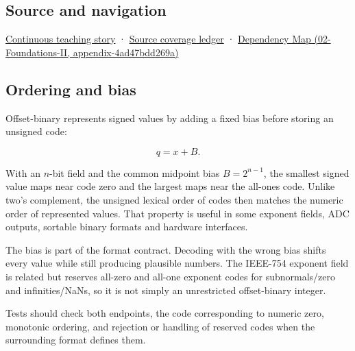 \subsection{Source and navigation}\label{source-and-navigation}

\href{Continuous\%20Notes/Computing\%20Foundations\%20-\%20From\%20Bits\%20to\%20C++\%20and\%20Systems\%20APIs\#Choosing\%20what\%20information\%20to\%20keep}{Continuous teaching story} · \hyperref[appendix-fd090d982a15]{Source coverage ledger} · \href{}{Dependency Map (02-Foundations-II, appendix-4ad47bdd269a)}

\subsection{Ordering and bias}\label{ordering-and-bias}

Offset-binary represents signed values by adding a fixed bias before storing an unsigned code:

\[q=x+B.\]

With an \(n\)-bit field and the common midpoint bias \(B=2^{n-1}\), the smallest signed value maps near code zero and the largest maps near the all-ones code. Unlike two's complement, the unsigned lexical order of codes then matches the numeric order of represented values. That property is useful in some exponent fields, ADC outputs, sortable binary formats and hardware interfaces.

The bias is part of the format contract. Decoding with the wrong bias shifts every value while still producing plausible numbers. The IEEE-754 exponent field is related but reserves all-zero and all-one exponent codes for subnormals/zero and infinities/NaNs, so it is not simply an unrestricted offset-binary integer.

Tests should check both endpoints, the code corresponding to numeric zero, monotonic ordering, and rejection or handling of reserved codes when the surrounding format defines them.
